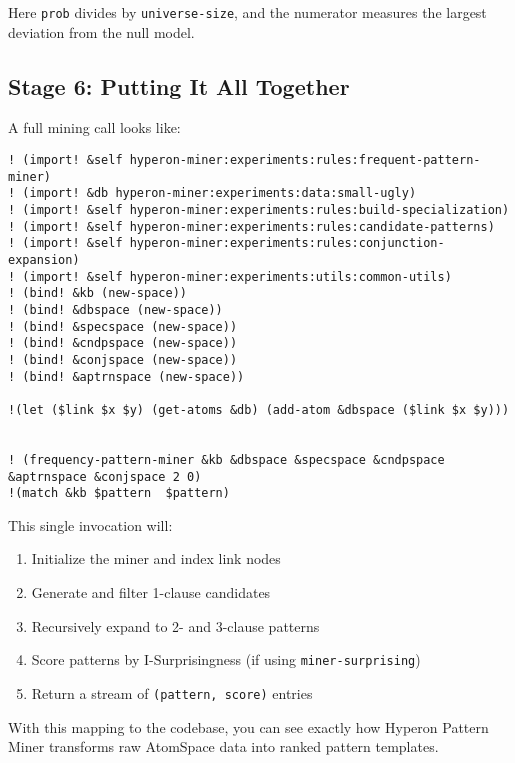 \documentclass{article}
\begin{document}
Here \texttt{prob} divides by \texttt{universe-size}, and the numerator measures the largest deviation from the null model.

\subsection{Stage 6: Putting It All Together}

A full mining call looks like:

\begin{verbatim}
! (import! &self hyperon-miner:experiments:rules:frequent-pattern-miner)
! (import! &db hyperon-miner:experiments:data:small-ugly)
! (import! &self hyperon-miner:experiments:rules:build-specialization)
! (import! &self hyperon-miner:experiments:rules:candidate-patterns)
! (import! &self hyperon-miner:experiments:rules:conjunction-expansion)
! (import! &self hyperon-miner:experiments:utils:common-utils)
! (bind! &kb (new-space))
! (bind! &dbspace (new-space))
! (bind! &specspace (new-space))
! (bind! &cndpspace (new-space))
! (bind! &conjspace (new-space))
! (bind! &aptrnspace (new-space))

!(let ($link $x $y) (get-atoms &db) (add-atom &dbspace ($link $x $y)))


! (frequency-pattern-miner &kb &dbspace &specspace &cndpspace &aptrnspace &conjspace 2 0)
!(match &kb $pattern  $pattern)
\end{verbatim}

This single invocation will:

\begin{enumerate}
  \item Initialize the miner and index link nodes
  \item Generate and filter 1-clause candidates
  \item Recursively expand to 2- and 3-clause patterns
  \item Score patterns by I-Surprisingness (if using \texttt{miner-surprising})
  \item Return a stream of \texttt{(pattern, score)} entries
\end{enumerate}

With this mapping to the codebase, you can see exactly how Hyperon Pattern Miner transforms raw AtomSpace data into ranked pattern templates.
\end{document}
